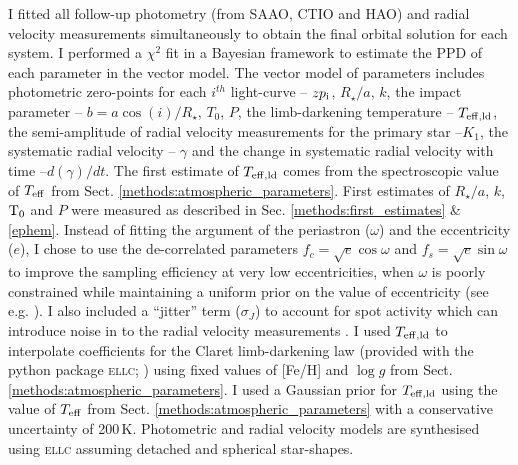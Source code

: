 I fitted all follow-up  photometry (from SAAO, CTIO and HAO) and radial velocity measurements simultaneously to obtain the final orbital solution for each system. I performed a $\chi^2$ fit in a Bayesian framework to estimate the PPD of each parameter in the vector model. The vector model of parameters includes photometric zero-points for each $i^{th}$ light-curve -- $zp_{\rm i}$, $R_{\star}/a$, $k$, the impact parameter -- $b = a\cos(i)/R_{\star}$, $T_0$, $P$, the limb-darkening temperature -- $T_{\rm eff,ld}$, the semi-amplitude of radial velocity measurements for the primary star --$K_1$, the systematic radial velocity -- $\gamma$ and the change in systematic radial velocity with time --$d(\gamma)/dt$. The first estimate of $T_{\rm eff,ld}$ comes from the spectroscopic value of $T_{\rm eff}$ from Sect. \ref{methods:atmospheric_parameters}. First estimates of $R_{\star}/a$, $k$, $\rm T_0$ and $P$ were measured as described in Sec. \ref{methods:first_estimates} \&  \ref{ephem}. Instead of fitting the argument of the periastron ($\omega$) and the eccentricity ($e$), I chose to use the de-correlated parameters $f_c = \sqrt{e} \cos \omega$ and  $f_s = \sqrt{e} \sin \omega$ to improve the sampling efficiency at very low eccentricities, when $\omega$ is poorly constrained while maintaining a uniform prior on the value of eccentricity (see e.g. \citealt{2005AJ....129.1706F}). I also included a ``jitter'' term ($\sigma_J$) to account for spot activity which can introduce noise in to the radial velocity measurements \citep{2006ApJ...642..505F}. I used $T_{\rm eff,ld}$ to interpolate coefficients for the Claret limb-darkening law (provided with the python package \textsc{ellc}; \citealt{2016A26A...591A.111M}) using fixed values of [Fe/H] and $\log g$ from Sect. \ref{methods:atmospheric_parameters}. I used a Gaussian prior for $T_{\rm eff,ld}$ using the value of $T_{\rm eff}$ from Sect. \ref{methods:atmospheric_parameters} with a conservative uncertainty of 200\,K. Photometric and radial velocity models are synthesised using \textsc{ellc} assuming detached and spherical star-shapes.

